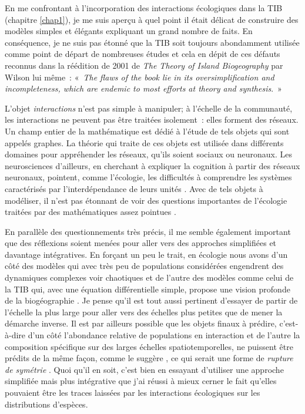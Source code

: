 En me confrontant à l'incorporation des interactions écologiques dans la
TIB (chapitre \ref{chap1}), je me suis aperçu à quel point il était
délicat de construire des modèles simples et élégants expliquant un
grand nombre de faits. En conséquence, je ne suis pas étonné que la TIB
soit toujours abondamment utilisée comme point de départ de nombreuses
études \citep{Warren2015} et cela en dépit de ces défauts reconnus dans
la réédition de 2001 de \emph{The Theory of Island Biogeography} par
Wilson lui même~: «~\emph{The flaws of the book lie in its
oversimplification and incompleteness, which are endemic to most efforts
at theory and synthesis}.~»

L'objet \emph{interactions} n'est pas simple à manipuler; à l'échelle de
la communauté, les interactions ne peuvent pas être traitées isolement~:
elles forment des réseaux. Un champ entier de la mathématique est dédié
à l'étude de tels objets qui sont appelés graphes. La théorie qui traite
de ces objets est utilisée dans différents domaines pour appréhender les
réseaux, qu'ils soient sociaux ou neuronaux. Les neurosciences
d'ailleurs, en cherchant à expliquer la cognition à partir des réseaux
neuronaux, pointent, comme l'écologie, les difficultés à comprendre les
systèmes caractérisés par l'interdépendance de leurs unités
\citep{Park2013}. Avec de tels objets à modéliser, il n'est pas étonnant
de voir des questions importantes de l'écologie traitées par des
mathématiques assez pointues \citep{Allesina2012a, Rohr2014}.

En parallèle des questionnements très précis, il me semble également
important que des réflexions soient menées pour aller vers des approches
simplifiées et davantage intégratives. En forçant un peu le trait, en
écologie nous avons d'un côté des modèles qui avec très peu de
populations considérées engendrent des dynamiques complexes voir
chaotiques \citep[dont l'existence est validée
expérimentalement][]{Costantino1997b, Fussmann2000} et de l'autre des
modèles comme celui de la TIB qui, avec une équation différentielle
simple, propose une vision profonde de la biogéographie
\citep{MacArthur1967}. Je pense qu'il est tout aussi pertinent d'essayer
de partir de l'échelle la plus large pour aller vers des échelles plus
petites que de mener la démarche inverse. Il est par ailleurs possible
que les objets finaux à prédire, c'est-à-dire d'un côté l'abondance
relative de populations en interaction et de l'autre la composition
spécifique sur des larges échelles spatiotemporelles, ne puissent être
prédits de la même façon, comme le suggère \citet{Lawton1999}, ce qui
serait une forme de \emph{rupture de symétrie} \citep[au sens
de][]{Anderson1972}. Quoi qu'il en soit, c'est bien en essayant
d'utiliser une approche simplifiée mais plus intégrative que j'ai réussi
à mieux cerner le fait qu'elles pouvaient être les traces laissées par
les interactions écologiques sur les distributions d'espèces.

